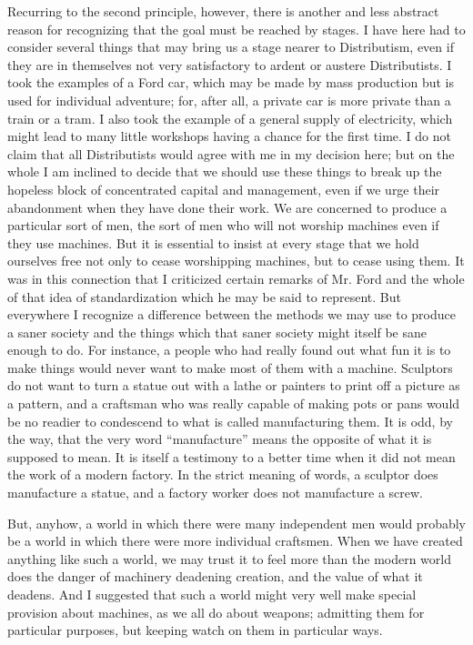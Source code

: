 \documentclass{book}
\begin{document}
Recurring to the second principle, however, there is another and less abstract reason for recognizing that the goal must be reached by stages. I have here had to consider several things that may bring us a stage nearer to Distributism, even if they are in themselves not very satisfactory to ardent or austere Distributists. I took the examples of a Ford car, which may be made by mass production but is used for individual adventure; for, after all, a private car is more private than a train or a tram. I also took the example of a general supply of electricity, which might lead to many little workshops having a chance for the first time. I do not claim that all Distributists would agree with me in my decision here; but on the whole I am inclined to decide that we should use these things to break up the hopeless block of concentrated capital and management, even if we urge their abandonment when they have done their work. We are concerned to produce a particular sort of men, the sort of men who will not worship machines even if they use machines. But it is essential to insist at every stage that we hold ourselves free not only to cease worshipping machines, but to cease using them. It was in this connection that I criticized certain remarks of Mr. Ford and the whole of that idea of standardization which he may be said to represent. But everywhere I recognize a difference between the methods we may use to produce a saner society and the things which that saner society might itself be sane enough to do. For instance, a people who had really found out what fun it is to make things would never want to make most of them with a machine. Sculptors do not want to turn a statue out with a lathe or painters to print off a picture as a pattern, and a craftsman who was really capable of making pots or pans would be no readier to condescend to what is called manufacturing them. It is odd, by the way, that the very word “manufacture” means the opposite of what it is supposed to mean. It is itself a testimony to a better time when it did not mean the work of a modern factory. In the strict meaning of words, a sculptor does manufacture a statue, and a factory worker does not manufacture a screw.

But, anyhow, a world in which there were many independent men would probably be a world in which there were more individual craftsmen. When we have created anything like such a world, we may trust it to feel more than the modern world does the danger of machinery deadening creation, and the value of what it deadens. And I suggested that such a world might very well make special provision about machines, as we all do about weapons; admitting them for particular purposes, but keeping watch on them in particular ways.
\end{document}
